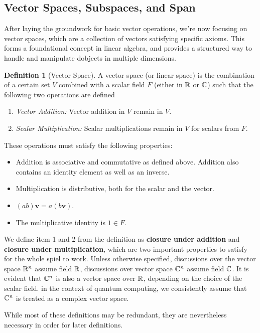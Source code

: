 \documentclass[12pt]{article}
\theoremstyle{definition}
\newtheorem{definition}[theorem]{Definition}
\begin{document}
\subsection{Vector Spaces, Subspaces, and Span}

After laying the groundwork for basic vector operations, we're now focusing on vector spaces, which are a collection of vectors satisfying specific axioms. This forms a foundational concept in linear algebra, and provides a structured way to handle and manipulate dobjects in multiple dimensions. 

\begin{definition}[Vector Space]
    A vector space (or linear space) is the combination of a certain set $V$ combined with a scalar field $F$ (either in $\mathbb{R}$ or $\mathbb{C}$) such that the following two operations are defined
    \begin{enumerate}
        \item \emph{Vector Addition:} Vector addition in $V$ remain in $V$.
        \item \emph{Scalar Multiplication:} Scalar multiplications remain in $V$ for scalars from $F$. 
    \end{enumerate}
    These operations must satisfy the following properties:
    \begin{itemize}
        \item Addition is associative and commutative as defined above. Addition also contains an identity element as well as an inverse.
        \item Multiplication is distributive, both for the scalar and the vector. 
        \item $(ab)\mathbf{v} = a(b\mathbf{v})$.
        \item The multiplicative identity is $1 \in F$.    
    \end{itemize}
\end{definition}

We define item 1 and 2 from the definition as \textbf{closure under addition} and \textbf{closure under multiplication}, which are two important properties to satisfy for the whole spiel to work. Unless otherwise specified, discussions over the vector space $\mathbb{R}^n$ assume field $\mathbb{R}$, discussions over vector space $\mathbb{C}^n$ assume field $\mathbb{C}$. It is evident that $\mathbb{C}^n$ is also a vector space over $\mathbb{R}$, depending on the choice of the scalar field. in the context of quantum computing, we consistently assume that $\mathbb{C}^n$ is treated as a complex vector space. 

While most of these definitions may be redundant, they are nevertheless necessary in order for later definitions.
\end{document}
